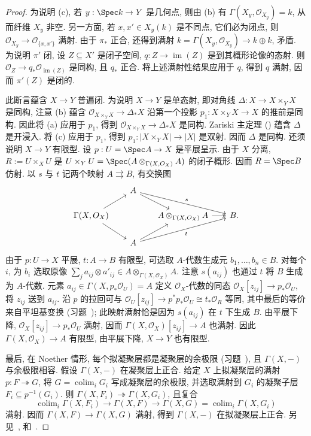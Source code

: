 \begin{proof}
为说明 (c), 若 $y:\Spec k\to Y$ 是几何点, 则由 (b) 有 $\Gamma(X_y,\mathcal O_{X_y})=k$, 从而纤维 $X_y$ 非空. 另一方面, 若 $x,x'\in X_y(k)$ 是不同点, 它们必为闭点, 则 $\mathcal O_{X_y}\to\mathcal O_{\{x,x'\}}$ 满射. 由于 $\pi_*$ 正合, 还得到满射 $k=\Gamma(X_y,\mathcal O_{X_y})\to k\oplus k$, 矛盾. 为说明 $\pi'$ 闭, 设 $Z\subseteq X'$ 是闭子空间, $q:Z\to\operatorname{im}(Z)$ 是到其概形论像的态射. 则 $\mathcal O_Z\to q_*\mathcal O_{\operatorname{im}(Z)}$ 是同构, 且 $q_*$ 正合. 将上述满射性结果应用于 $q$, 得到 $q$ 满射, 因而 $\pi'(Z)$ 是闭的.

此断言蕴含 $X\to Y$ 普遍闭. 为说明 $X\to Y$ 是单态射, 即对角线 $\Delta:X\to X\times_Y X$ 是同构, 注意 (b) 蕴含 $\mathcal O_{X\times_Y X}\to\Delta_*X$ 沿第一个投影 $p_1:X\times_Y X\to X$ 的推前是同构. 因此将 (a) 应用于 $p_1$, 得到 $\mathcal O_{X\times_Y X}\to\Delta_*X$ 是同构. Zariski 主定理 () 蕴含 $\Delta$ 是开浸入. 将 (c) 应用于 $p_1$, 得到 $p_1:|X\times_Y X|\to|X|$ 是双射. 因而 $\Delta$ 是同构. 还须说明 $X\to Y$ 有限型. 设 $p:U=\Spec A\to X$ 是平展呈示. 由于 $X$ 分离, $R:=U\times_X U$ 是 $U\times_Y U=\Spec(A\otimes_{\Gamma(X,\mathcal O_X)}A)$ 的闭子概形. 因而 $R=\Spec B$ 仿射. 以 $s$ 与 $t$ 记两个映射 $A\rightrightarrows B$, 有交换图
\[
\begin{tikzcd}[row sep=1.5em,column sep=1.7em]
&A\arrow[dr]\arrow[drr,"s"]&&\\
\Gamma(X,\mathcal O_X)\arrow[ur]\arrow[dr]&&A\otimes_{\Gamma(X,\mathcal O_X)}A\arrow[r,two heads]&B.\\
&A\arrow[ur]\arrow[urr,"t"']&&
\end{tikzcd}
\]
由于 $p:U\to X$ 平展, $t:A\to B$ 有限型, 可选取 $A$-代数生成元 $b_1,\ldots,b_n\in B$. 对每个 $i$, 为 $b_i$ 选取原像 $\sum_j a_{ij}\otimes a'_{ij}\in A\otimes_{\Gamma(X,\mathcal O_X)}A$. 注意 $s(a_{ij})$ 也通过 $t$ 将 $B$ 生成为 $A$-代数. 元素 $a_{ij}\in\Gamma(X,p_*\mathcal O_U)=A$ 定义 $\mathcal O_X$-代数的同态 $\mathcal O_X[z_{ij}]\to p_*\mathcal O_U$, 将 $z_{ij}$ 送到 $a_{ij}$. 沿 $p$ 的拉回可与 $\mathcal O_U[z_{ij}]\to p^*p_*\mathcal O_U\cong t_*\mathcal O_R$ 等同, 其中最后的等价来自平坦基变换 (习题~); 此映射满射恰是因为 $s(a_{ij})$ 在 $t$ 下生成 $B$. 由平展下降, $\mathcal O_X[z_{ij}]\to p_*\mathcal O_U$ 满射, 因而 $\Gamma(X,\mathcal O_X)[z_{ij}]\to A$ 也满射. 因此 $\Gamma(X,\mathcal O_X)\to A$ 有限型, 由平展下降, $X\to Y$ 也有限型.

最后, 在 Noether 情形, 每个拟凝聚层都是凝聚层的余极限 (习题~), 且 $\Gamma(X,-)$ 与余极限相容. 假设 $\Gamma(X,-)$ 在凝聚层上正合. 给定 $X$ 上拟凝聚层的满射 $p:F\twoheadrightarrow G$, 将 $G=\operatorname{colim}_i G_i$ 写成凝聚层的余极限, 并选取满射到 $G_i$ 的凝聚子层 $F_i\subseteq p^{-1}(G_i)$. 则 $\Gamma(X,F_i)\twoheadrightarrow\Gamma(X,G_i)$, 且复合
\[
\operatorname{colim}_i\Gamma(X,F_i)\longrightarrow\Gamma(X,F)\longrightarrow\Gamma(X,G)=\operatorname{colim}_i\Gamma(X,G_i)
\]
满射. 因而 $\Gamma(X,F)\to\Gamma(X,G)$ 满射, 得到 $\Gamma(X,-)$ 在拟凝聚层上正合. 另见~\cite[定理 III.2.5]{Knu71}, \cite[定理 $8.7$]{Ryd15} 和~\cite[Tag 07V6]{SP}.
\end{proof}
